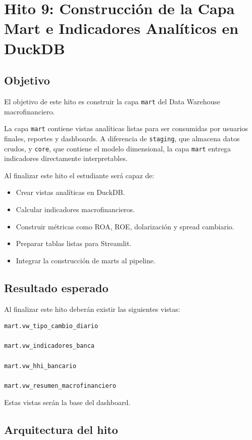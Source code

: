 \chapter{Hito 9: Construcción de la Capa Mart e Indicadores Analíticos en DuckDB}

\section{Objetivo}

El objetivo de este hito es construir la capa \texttt{mart} del Data Warehouse macrofinanciero.

La capa \texttt{mart} contiene vistas analíticas listas para ser consumidas por usuarios finales, reportes y dashboards. A diferencia de \texttt{staging}, que almacena datos crudos, y \texttt{core}, que contiene el modelo dimensional, la capa \texttt{mart} entrega indicadores directamente interpretables.

Al finalizar este hito el estudiante será capaz de:

\begin{itemize}
\item Crear vistas analíticas en DuckDB.
\item Calcular indicadores macrofinancieros.
\item Construir métricas como ROA, ROE, dolarización y spread cambiario.
\item Preparar tablas listas para Streamlit.
\item Integrar la construcción de marts al pipeline.
\end{itemize}

\section{Resultado esperado}

Al finalizar este hito deberán existir las siguientes vistas:

\begin{verbatim}
mart.vw_tipo_cambio_diario

mart.vw_indicadores_banca

mart.vw_hhi_bancario

mart.vw_resumen_macrofinanciero
\end{verbatim}

Estas vistas serán la base del dashboard.

\section{Arquitectura del hito}

